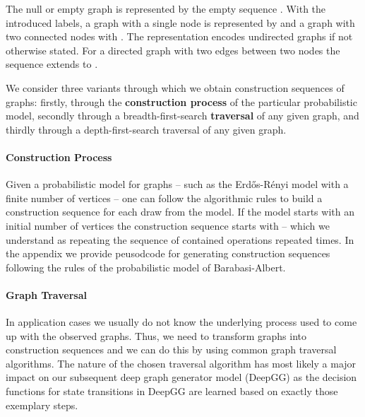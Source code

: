 \documentclass{article}
\begin{document}
The null or empty graph is represented by the empty sequence .
With the introduced labels, a graph with a single node is represented by  and a graph with two connected nodes with .
The representation encodes undirected graphs if not otherwise stated.
For a directed graph with two edges between two nodes the sequence extends to .

We consider three variants through which we obtain construction sequences of graphs: firstly, through the \textbf{construction process} of the particular probabilistic model, secondly through a breadth-first-search \textbf{traversal} of any given graph, and thirdly through a depth-first-search traversal of any given graph.




\paragraph{Construction Process}
Given a probabilistic model for graphs -- such as the Erdős-Rényi model with a finite number of vertices -- one can follow the algorithmic rules to build a construction sequence for each draw from the model.
If the model starts with an initial number of  vertices the construction sequence starts with  -- which we understand as repeating the sequence of contained operations repeated  times.
In the appendix we provide peusodcode for generating construction sequences following the rules of the probabilistic model of Barabasi-Albert.


\paragraph{Graph Traversal}
In application cases we usually do not know the underlying process used to come up with the observed graphs.
Thus, we need to transform graphs into construction sequences and we can do this by using common graph traversal algorithms.
The nature of the chosen traversal algorithm has most likely a major impact on our subsequent deep graph generator model (DeepGG) as the decision functions for state transitions in DeepGG are learned based on exactly those exemplary steps.
\end{document}
